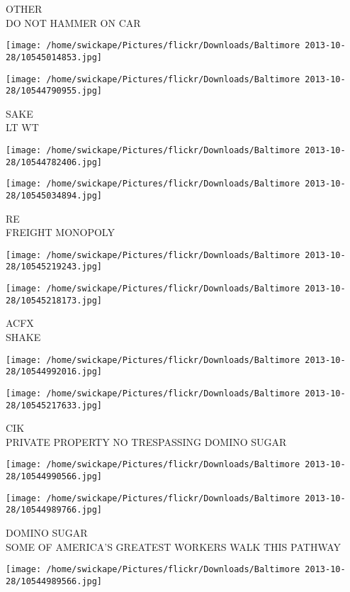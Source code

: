 \documentclass[10pt,letterpaper]{article}
\begin{document}
OTHER\\
DO NOT HAMMER ON CAR
\pagebreak

\texttt{[image: /home/swickape/Pictures/flickr/Downloads/Baltimore 2013-10-28/10545014853.jpg]}

\vspace{0.25in}
\texttt{[image: /home/swickape/Pictures/flickr/Downloads/Baltimore 2013-10-28/10544790955.jpg]}

SAKE\\
LT WT
\pagebreak

\texttt{[image: /home/swickape/Pictures/flickr/Downloads/Baltimore 2013-10-28/10544782406.jpg]}

\vspace{0.25in}
\texttt{[image: /home/swickape/Pictures/flickr/Downloads/Baltimore 2013-10-28/10545034894.jpg]}

RE\\
FREIGHT MONOPOLY
\pagebreak

\texttt{[image: /home/swickape/Pictures/flickr/Downloads/Baltimore 2013-10-28/10545219243.jpg]}

\vspace{0.25in}
\texttt{[image: /home/swickape/Pictures/flickr/Downloads/Baltimore 2013-10-28/10545218173.jpg]}

ACFX\\
SHAKE
\pagebreak

\texttt{[image: /home/swickape/Pictures/flickr/Downloads/Baltimore 2013-10-28/10544992016.jpg]}

\vspace{0.25in}
\texttt{[image: /home/swickape/Pictures/flickr/Downloads/Baltimore 2013-10-28/10545217633.jpg]}

CIK\\
PRIVATE PROPERTY NO TRESPASSING DOMINO SUGAR
\pagebreak

\texttt{[image: /home/swickape/Pictures/flickr/Downloads/Baltimore 2013-10-28/10544990566.jpg]}

\vspace{0.25in}
\texttt{[image: /home/swickape/Pictures/flickr/Downloads/Baltimore 2013-10-28/10544989766.jpg]}

DOMINO SUGAR\\
SOME OF AMERICA'S GREATEST WORKERS WALK THIS PATHWAY
\pagebreak

\texttt{[image: /home/swickape/Pictures/flickr/Downloads/Baltimore 2013-10-28/10544989566.jpg]}
\end{document}
